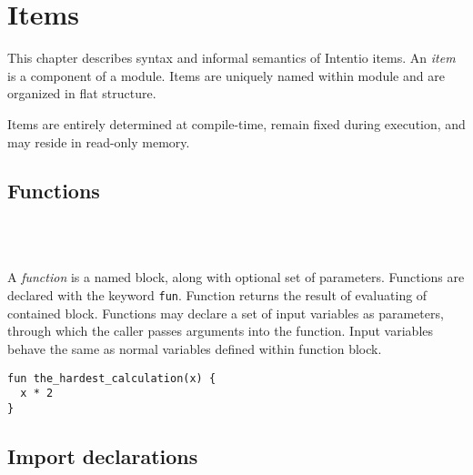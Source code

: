 \chapter{Items}

This chapter describes syntax and informal semantics of Intentio items. An \emph{item} is a component of a module. Items are uniquely named within module and are organized in flat structure.

Items are entirely determined at compile-time, remain fixed during execution, and may reside in read-only memory.

\begin{bnf}
   \eq    {}    
                \gorln {} 
\end{bnf}

\section{Functions}

\begin{bnf}
   \eq {} \  \ \term{(} \  \ \term{)} \  \\
   \eq {} \  \ \gtry{\term{,}}
\end{bnf}

A \emph{function} is a named block, along with optional set of parameters. Functions are declared with the keyword \lstinline{fun}. Function returns the result of evaluating of contained block. Functions may declare a set of input variables as parameters, through which the caller passes arguments into the function. Input variables behave the same as normal variables defined within function block.

\begin{example}
\begin{lstlisting}
fun the_hardest_calculation(x) {
  x * 2
}
\end{lstlisting}
\end{example}

\section{Import declarations}

\begin{bnf}
   \eq    {} \  
                  \gorln {} \  \  \  
\end{bnf}

